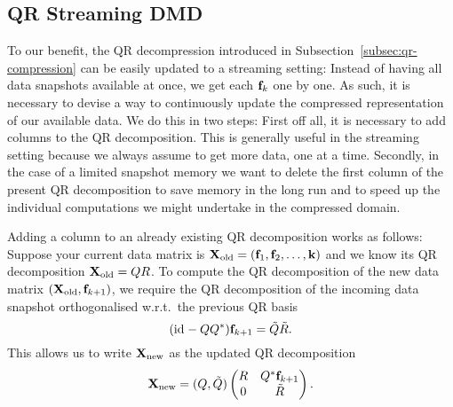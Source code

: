 \subsection{QR Streaming DMD}\label{subsec:qr-update} %

To our benefit, the QR decompression introduced in Subsection~\ref{subsec:qr-compression} can be easily updated to a streaming setting: Instead of having all data snapshots available at once, we get each $\mathbf{f}_k$ one by one. As such, it is necessary to devise a way to continuously update the compressed representation of our available data. We do this in two steps: First off all, it is necessary to add columns to the QR decomposition. This is generally useful in the streaming setting because we always assume to get more data, one at a time. Secondly, in the case of a limited snapshot memory we want to delete the first column of the present QR decomposition to save memory in the long run and to speed up the individual computations we might undertake in the compressed domain.

Adding a column to an already existing QR decomposition works as follows: Suppose your current data matrix is $\mathbf{X}_\text{old} = (\mathbf{f}_1, \mathbf{f}_2, \dots, \mathbf{k})$ and we know its QR decomposition $\mathbf{X}_\text{old} = Q R$. To compute the QR decomposition of the new data matrix $(\mathbf{X}_\text{old}, \mathbf{f}_{k + 1})$, we require the QR decomposition of the incoming data snapshot orthogonalised w.r.t.\ the previous QR basis
\begin{equation*}
    (\mathop{}\!\mathrm{id}_{} - Q Q^*) \mathbf{f}_{k + 1} = \tilde{Q} \tilde{R}.
\end{equation*}
This allows us to write $\mathbf{X}_\text{new}$ as the updated QR decomposition
\begin{equation*}
    \mathbf{X}_\text{new} = (Q, \tilde{Q}) \begin{pmatrix}
        R & Q^* \mathbf{f}_{k + 1} \\
        0 & \tilde{R}
    \end{pmatrix}.
\end{equation*}

